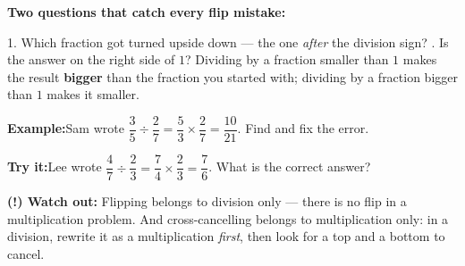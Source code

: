 \documentclass[12pt]{article}
\begin{document}
\begin{formulabox}\textbf{Two questions that catch every flip mistake:}\par
1. Which fraction got turned upside down --- the one \emph{after} the division
sign? . Is the answer on the right side of $1$? Dividing by a fraction
smaller than $1$ makes the result \textbf{bigger} than the fraction you
started with; dividing by a fraction bigger than $1$ makes it smaller.
\end{formulabox}
\begin{examplebox}\textbf{Example:}\quad Sam wrote
$\dfrac{3}{5} \div \dfrac{2}{7} = \dfrac{5}{3} \times \dfrac{2}{7} =
\dfrac{10}{21}$. Find and fix the error.
\end{examplebox}
\begin{tryitbox}\textbf{Try it:}\quad Lee wrote
$\dfrac{4}{7} \div \dfrac{2}{3} = \dfrac{7}{4} \times \dfrac{2}{3} =
\dfrac{7}{6}$. What is the correct answer?\\[2pt]
\end{tryitbox}

\begin{watchoutbox}\textbf{(!) Watch out:} Flipping belongs to division only
--- there is no flip in a multiplication problem. And cross-cancelling belongs
to multiplication only: in a division, rewrite it as a multiplication
\emph{first}, then look for a top and a bottom to cancel.
\end{watchoutbox}
\end{document}
